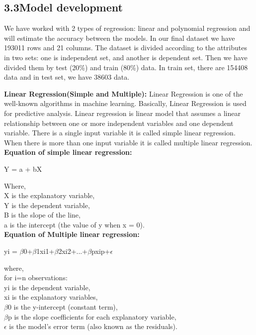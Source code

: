 \documentclass[conference]{IEEEtran}[10]
\begin{document}
\subsection{3.3Model development}
We have worked with 2 types of regression: linear and polynomial regression and will estimate the accuracy between the models. In our final dataset we have 193011 rows and 21 columns. The dataset is divided according to the attributes in two sets: one is independent set, and another is dependent set. Then we have divided them by test (20\%) and train (80\%) data. In train set, there are 154408 data and in test set, we have 38603 data.

\textbf{Linear Regression(Simple and Multiple):}
Linear Regression is one of the well-known algorithms in machine learning. Basically, Linear Regression is used for predictive analysis. Linear regression is linear model that assumes a linear relationship between one or more independent variables and one dependent variable. There is a single input variable it is called simple linear regression. When there is more than one input variable it is called multiple linear regression.
\\\textbf{Equation of simple linear regression:}
\begin{center}
{\large Y = a + bX}
\end{center}
Where,
\\X is the explanatory variable,
\\Y is the dependent variable, 
\\B is the slope of the line,
\\a is the intercept (the value of y when x = 0).
\\\textbf{Equation of Multiple linear regression:}
\begin{center}
{\large yi = $\beta$0+$\beta$1xi1+$\beta$2xi2+...+$\beta$pxip+$\epsilon$}
\end{center}
where,
\\for i=n observations:
\\yi is the dependent variable,
\\xi is the explanatory variables,
\\$\beta$0 is the y-intercept (constant term),
\\$\beta$p  is the slope coefficients for each explanatory variable,
\\$\epsilon$ is the model’s error term (also known as the residuals).
\end{document}
